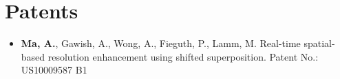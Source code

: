 \section*{Patents}
    \vspace{\postsubhead}
    \begin{adjustwidth}{\indentleft}{\indentright}
    \begin{itemize}
        \item \textbf{Ma, A.}, Gawish, A., Wong, A., Fieguth, P., Lamm, M. Real-time spatial-based resolution enhancement using shifted superposition. Patent No.: US10009587 B1
      \end{itemize}
    \end{adjustwidth}
    \vspace{\postsection}
